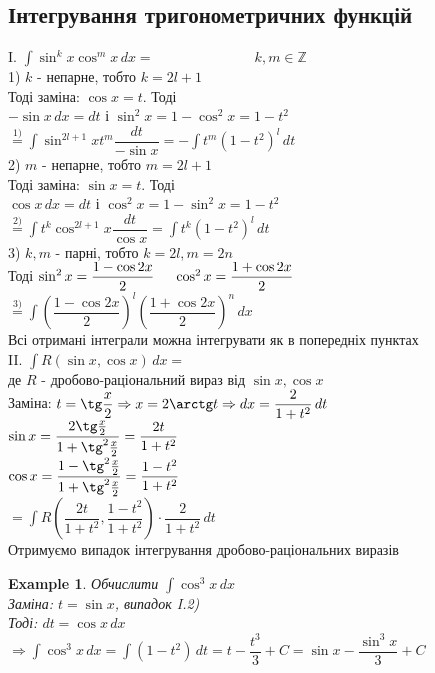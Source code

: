 \documentclass[a4paper, 14pt]{extarticle}
\def\huge{\displaystyle}
\def\bigline{\vspace{5mm}\\}
\theoremstyle{theoremdd}
\theoremstyle{theoremdd}
\theoremstyle{theoremdd}
\theoremstyle{theoremdd}
\newtheorem{example}[theorem]{Example}
\theoremstyle{theoremdd}
\theoremstyle{theoremdd}
\theoremstyle{theoremdd}
\theoremstyle{theoremdd}
\begin{document}
\subsection{Інтегрування тригонометричних функцій}
I. $\huge \int \sin^k x \cos^m x \,dx \boxed{=} \hspace{3cm} k,m \in \mathbb{Z}$\\
1) $k$ - непарне, тобто $k = 2l+1$ 
\\Тоді заміна: $\cos x = t$. Тоді\\
$-\sin x \,dx = dt$ і $\sin^2 x = 1 - \cos ^2x = 1 - t^2$\\
$\boxed{\overset{1)}{=}} \huge \int \sin^{2l+1} x t^m \dfrac{dt}{-\sin x} = -\int t^m (1-t^2)^l\,dt$
\bigline
2) $m$ - непарне, тобто $m = 2l+1$
\\ Тоді заміна: $\sin x = t$. Тоді\\
$\cos x \,dx = dt$ і $\cos^2 x = 1 - \sin^2 x = 1 - t^2$\\
$\boxed{\overset{2)}{=}} \huge \int t^k \cos^{2l+1}x \dfrac{dt}{\cos x} = \int t^k(1-t^2)^l \,dt$
\bigline
3) $k,m$ - парні, тобто $k=2l, m =2n$\\
Тоді $\sin^2 x = \dfrac{1-\cos 2x}{2} \hspace{0.5cm} \cos^2 x = \dfrac{1+\cos 2x}{2}$\\
$\boxed{\overset{3)}{=}} \huge \int \left( \dfrac{1-\cos 2x}{2} \right)^l \left( \dfrac{1+\cos 2x}{2} \right)^n \,dx$
\bigline
Всі отримані інтеграли можна інтегрувати як в попередніх пунктах
\bigline
II. $\huge \int R(\sin x, \cos x)\,dx \boxed{=}$\\
де $R$ - дробово-раціональний вираз від $\sin x, \cos x$\\
Заміна: $t = \tg \dfrac{x}{2} \Rightarrow x = 2 \arctg t \Rightarrow dx = \dfrac{2}{1+t^2}\,dt$\\
$\sin x = \dfrac{2 \tg \frac{x}{2}}{1 + \tg^2 \frac{x}{2}} = \dfrac{2t}{1+t^2}$\\
$\cos x = \dfrac{1 - \tg^2 \frac{x}{2}}{1 + \tg^2 \frac{x}{2}} = \dfrac{1-t^2}{1+t^2}$\\
$\boxed{=} \huge \int R\left(\dfrac{2t}{1+t^2}, \dfrac{1-t^2}{1+t^2} \right) \cdot \dfrac{2}{1+t^2}\,dt$\\
Отримуємо випадок інтегрування дробово-раціональних виразів
\bigline

\begin{example}
Обчислити $\huge \int \cos^3 x \,dx$\\
Заміна: $t = \sin x$, випадок I.2)\\
Тоді: $dt = \cos x \,dx$\\
$\Rightarrow \huge \int \cos^3 x \,dx = \int (1-t^2) \,dt = t - \dfrac{t^3}{3} + C = \sin x -\dfrac{\sin^3 x}{3} + C$
\end{example}
\end{document}
